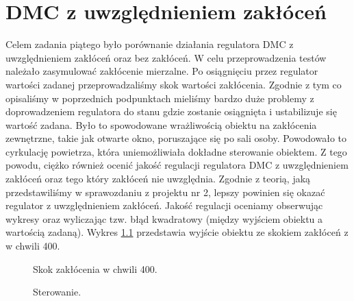 \chapter{DMC z uwzględnieniem zakłóceń}
Celem zadania piątego było porównanie działania regulatora DMC z uwzględnieniem
zakłóceń oraz bez zakłóceń. W celu przeprowadzenia testów należało zasymulować
zakłócenie mierzalne. Po osiągnięciu przez regulator wartości zadanej
przeprowadzaliśmy skok wartości zakłócenia. Zgodnie z tym co opisaliśmy w
poprzednich podpunktach mieliśmy bardzo duże problemy z doprowadzeniem regulatora
do stanu gdzie zostanie osiągnięta i ustabilizuje się wartość zadana. Było to
spowodowane wrażliwością obiektu na zakłócenia zewnętrzne, takie jak otwarte okno,
poruszające się po sali osoby. Powodowało to cyrkulację powietrza, która
uniemożliwiała dokładne sterowanie obiektem. Z tego powodu, ciężko również ocenić
jakość regulacji regulatora DMC z uwzględnieniem zakłóceń oraz tego który zakłóceń
nie uwzględnia. Zgodnie z teorią, jaką przedstawiliśmy w sprawozdaniu z
projektu nr 2, lepszy powinien się okazać regulator z uwzględnieniem zakłóceń.
Jakość regulacji oceniamy obserwując wykresy oraz wyliczając tzw. błąd kwadratowy
(między wyjściem obiektu a wartością zadaną). Wykres \ref{fig:zakl} przedstawia
wyjście obiektu ze skokiem zakłóceń z w chwili 400.

\begin{figure}[tb]
\centering
{}
\caption{Skok zakłócenia w chwili 400.}
\label{fig:zakl}
\end{figure}

\begin{figure}[tb]
\centering
{}
\caption{Sterowanie.}
\label{fig:ster_zakl}
\end{figure}
